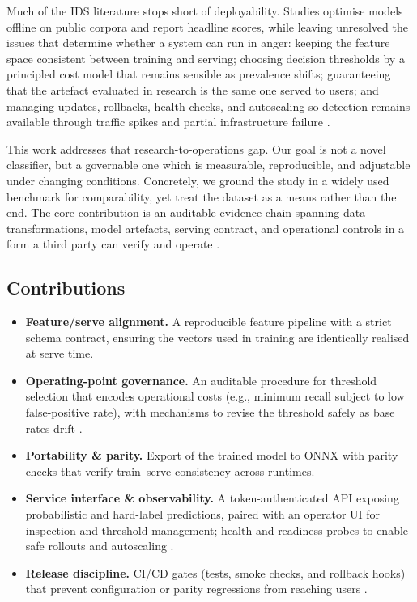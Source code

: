 \documentclass{article}
\begin{document}
Much of the IDS literature stops short of deployability. Studies optimise models offline on public corpora and report headline scores, while leaving unresolved the issues that determine whether a system can run in anger: keeping the feature space consistent between training and serving; choosing decision thresholds by a principled cost model that remains sensible as prevalence shifts; guaranteeing that the artefact evaluated in research is the same one served to users; and managing updates, rollbacks, health checks, and autoscaling so detection remains available through traffic spikes and partial infrastructure failure \cite{apruzzese2023, landauer2022}.

This work addresses that research-to-operations gap. Our goal is not a novel classifier, but a governable one which is measurable, reproducible, and adjustable under changing conditions. Concretely, we ground the study in a widely used benchmark for comparability, yet treat the dataset as a means rather than the end. The core contribution is an auditable evidence chain spanning data transformations, model artefacts, serving contract, and operational controls in a form a third party can verify and operate \cite{bertoli2021, kim2012}.

\subsection*{Contributions}
\begin{itemize}
    \item \textbf{Feature/serve alignment.} A reproducible feature pipeline with a strict schema contract, ensuring the vectors used in training are identically realised at serve time.
    \item \textbf{Operating-point governance.} An auditable procedure for threshold selection that encodes operational costs (e.g., minimum recall subject to low false-positive rate), with mechanisms to revise the threshold safely as base rates drift \cite{strasburg2016}.
    \item \textbf{Portability \& parity.} Export of the trained model to ONNX with parity checks that verify train–serve consistency across runtimes.
    \item \textbf{Service interface \& observability.} A token-authenticated API exposing probabilistic and hard-label predictions, paired with an operator UI for inspection and threshold management; health and readiness probes to enable safe rollouts and autoscaling \cite{dreger2007}.
    \item \textbf{Release discipline.} CI/CD gates (tests, smoke checks, and rollback hooks) that prevent configuration or parity regressions from reaching users \cite{shaikh2009}.
\end{itemize}
\end{document}
